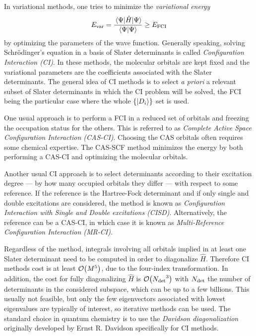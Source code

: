 \documentclass[./thesis.tex]{subfiles}
\begin{document}
In variational methods, one tries to minimize the \emph{variational energy}
\begin{equation}
E_\text{var} = \frac{\mel{\Psi}{\hat{H}}{\Psi}}{\braket{\Psi}{\Psi}} \ge E_\text{FCI}
\label{eq:evar}
\end{equation}
by optimizing the parameters of the wave function.
Generally speaking, solving Schrödinger's equation in a basis of Slater determinants is called \emph{Configuration Interaction (CI)}.
In these methods, the molecular orbitals are kept fixed and the variational parameters are the coefficients associated with the Slater determinants.
The general idea of CI methods is to select \textit{a priori} a relevant subset
of Slater determinants in which the CI problem will be solved, the FCI being
the particular case where the whole $\{\ket {D_i} \}$ set is used.

One usual approach is to perform a FCI in a reduced set of orbitals and freezing the occupation status for the others. This is referred to as \emph{Complete Active Space Configuration Interaction (CAS-CI)}. Choosing the CAS orbitals often requires some chemical expertise. The CAS-SCF method minimizes the energy by both performing a CAS-CI and optimizing the molecular orbitals.

Another usual CI approach is to select determinants according to their excitation degree --- by how many occupied orbitals they differ --- with respect to some reference. If the reference is the Hartree-Fock determinant and if only single and double excitations are considered, the method is known as \emph{Configuration Interaction with Single and Double excitations (CISD)}. Alternatively, the reference can be a CAS-CI, in which case it is known as \emph{Multi-Reference Configuration Interaction (MR-CI)}.

Regardless of the method, integrals involving all orbitals implied in at least one Slater determinant need to be computed in order to diagonalize $\widehat{H}$. Therefore CI methods cost is at least $\order{M^5}$, due to the four-index transformation.
In addition, the cost for fully diagonalizing $\widehat{H}$ is $\order{\Ndet^3}$ with ${N_\text{det}}$ the number of determinants in the considered subspace, which can be up to a few billions. This usually not feasible, but only the few eigenvectors associated with lowest eigenvalues are typically of interest, so iterative methods can be used. The standard choice in quantum chemistry is to use the \emph{Davidson diagonalization} originally developed by Ernst R. Davidson\cite{Davidson_1975} specifically for CI methods. 
\end{document}
